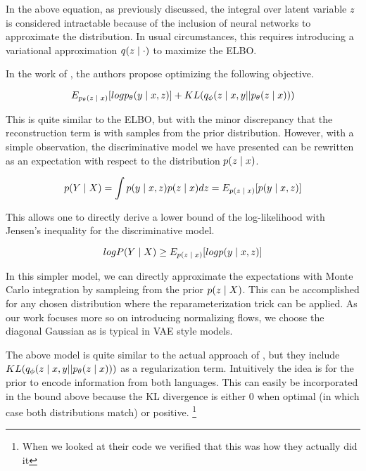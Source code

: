 In the above equation, as previously discussed, the integral over latent variable $z$ is considered intractable because of the inclusion of neural networks to approximate the distribution. In usual circumstances, this requires introducing a variational approximation $q(z \; | \;{\cdot})$ to maximize the \ac{ELBO}. %

In the work of \citet{Zhang2016VNMT}, the authors propose optimizing the following objective. 

\begin{equation}
E_{p_{\theta}(z \; | \;{x})}[log p_{\theta}(y \; | \;{x,z})] +  KL (q_{\phi}(z \; | \;{x, y} || p_{\theta}(z \; | \;{x})))
\end{equation}

This is quite similar to the \ac{ELBO}, but with the minor discrepancy that the reconstruction term is with samples from the prior distribution. 
However, with a simple observation, the discriminative model we have presented can be rewritten as an expectation with respect to the distribution $p(z \; | \;{x})$.

\begin{equation}
p(Y \; | \;{X})  = \int p(y \; | \;{x,z}) p(z \; | \;{x}) dz = E_{p(z \; | \;{x})}[p(y \; | \;{x,z})]
\end{equation}



This allows one to directly derive a lower bound of the log-likelihood with Jensen's inequality for the discriminative model. 

\begin{equation}
log P(Y \; | \;{X}) \geq E_{p(z \; | \;{x})}[log p(y \; | \;{x,z})]
\end{equation}

In this simpler model, we can directly approximate the expectations with Monte Carlo integration by sampleing from the prior $p(z \; | \;{X})$. This can be accomplished for any chosen distribution where the reparameterization trick can be applied. As our work focuses more so on introducing normalizing flows, we choose the diagonal Gaussian as is typical in \ac{VAE} style models. 

The above model is quite similar to the actual approach of \citet{Zhang2016VNMT}, but they include $KL (q_{\phi}(z \; | \;{x, y} || p_{\theta}(z \; | \;{x})))$ as a regularization term. Intuitively the idea is for the prior to encode information from both languages.  This can easily be incorporated in the bound above because the KL divergence is either 0 when optimal (in which case both distributions match) or positive.  \footnote{When we looked at their code we verified that this was how they actually did it} 


